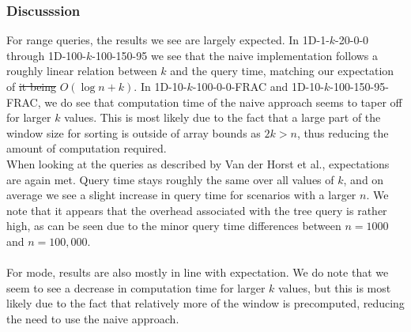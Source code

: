 \documentclass{article}
\newcommand{\fb}[1]{{\color{blue}#1}}
\newcommand{\fbrm}[1]{{\color{blue}\st{#1}}}
\begin{document}
\subsubsection*{Discusssion}
For range queries, the results we see are largely expected. In 1D-1-$k$-20-0-0 through 1D-100-$k$-100-150-95 we see that the naive implementation follows a roughly linear relation between $k$ and the query time, mat\fb{ch}ing our expectation of \fbrm{it being} $O(\log n + k)$. In 1D-10-$k$-100-0-0-FRAC and 1D-10-$k$-100-150-95-FRAC, we do see that computation time of the naive approach seems to taper off for larger $k$ values. This is most likely due to the fact that a large part of the window size for sorting is outside of array bounds as $2k > n$, thus reducing the amount of computation required. \\
When looking at the queries as described by Van der Horst et al., expectations are again met. Query time stays roughly the same over all values of $k$, and on average we see a slight increase in query time for scenarios with a larger $n$. We note that it appears that the overhead associated with the tree query is rather high, as can be seen due to the minor query time differences between $n=1000$ and $n=100,000$. \\\\
For mode, results are also mostly in line with expectation. We do note that we seem to see a decrease in computation time for larger $k$ values, but this is most likely due to the fact that relatively more of the window is precomputed, reducing the need to use the naive approach.
\end{document}
